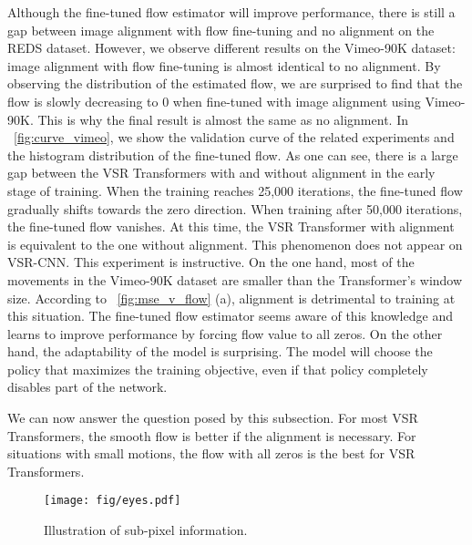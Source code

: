 \documentclass{article}
\begin{document}
Although the fine-tuned flow estimator will improve performance, there is still a gap between image alignment with flow fine-tuning and no alignment on the REDS dataset.
However, we observe different results on the Vimeo-90K dataset: image alignment with flow fine-tuning is almost identical to no alignment.
By observing the distribution of the estimated flow, we are surprised to find that the flow is slowly decreasing to 0 when fine-tuned with image alignment using Vimeo-90K.
This is why the final result is almost the same as no alignment.
In \figurename~\ref{fig:curve_vimeo}, we show the validation curve of the related experiments and the histogram distribution of the fine-tuned flow.
As one can see, there is a large gap between the VSR Transformers with and without alignment in the early stage of training.
When the training reaches 25,000 iterations, the fine-tuned flow gradually shifts towards the zero direction.
When training after 50,000 iterations, the fine-tuned flow vanishes.
At this time, the VSR Transformer with alignment is equivalent to the one without alignment.
This phenomenon does not appear on VSR-CNN.
This experiment is instructive.
On the one hand, most of the movements in the Vimeo-90K dataset are smaller than the Transformer's window size.
According to \figurename~\ref{fig:mse_v_flow} (a), alignment is detrimental to training at this situation.
The fine-tuned flow estimator seems aware of this knowledge and learns to improve performance by forcing flow value to all zeros.
On the other hand, the adaptability of the model is surprising.
The model will choose the policy that maximizes the training objective, even if that policy completely disables part of the network.


We can now answer the question posed by this subsection.
For most VSR Transformers, the smooth flow is better if the alignment is necessary.
For situations with small motions, the flow with all zeros is the best for VSR Transformers.

\begin{wrapfigure}{r}{0.2\linewidth}
\vspace{-6mm}
\centering
\texttt{[image: fig/eyes.pdf]}
\vspace{-5mm}
\caption{Illustration of sub-pixel information.}
\label{fig:eyes}
\vspace{-2mm}
\end{wrapfigure}


\vspace{-2mm}
\end{document}
